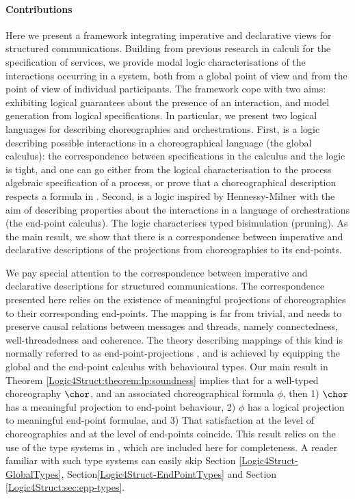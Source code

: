 \paragraph{Contributions}
Here we present a framework integrating imperative and declarative
views for structured communications. Building from previous research
in calculi for the specification of services, we
provide modal logic characterisations of the interactions occurring in
a system, both from a global point of view and from the point of view
of individual participants. The framework cope with two aims: exhibiting logical
guarantees about the presence of an interaction, and model generation
from logical specifications. In particular, we present two logical
languages for describing choreographies and orchestrations. First, \GL
is a logic describing possible interactions in a choreographical
language (the global calculus): the correspondence between
specifications in the calculus and the logic is tight, and one can go
either from the logical characterisation to the process algebraic
specification of a process, or prove that a choreographical
description respects a formula in \GL\!\!. Second, \LL is a logic
inspired by Hennessy-Milner with the aim of describing properties
about the interactions in a language of orchestrations (the end-point
calculus). The logic characterises typed bisimulation (pruning). As
the main result, we show that there is a correspondence between
imperative and declarative descriptions of the projections from
choreographies to its end-points. 


We pay special attention to the correspondence between imperative and
declarative descriptions for structured communications. The
correspondence presented here relies on the existence of meaningful
projections of choreographies to their corresponding end-points.  The
mapping is far from trivial, and needs to preserve causal relations
between messages and threads, namely connectedness, well-threadedness
and coherence. The theory describing mappings of this kind is normally
referred to as end-point-projections \cite{carbone7scc}, and is
achieved by equipping the global and the end-point calculus with
behavioural types.  Our main result in Theorem
\ref{Logic4Struct:theorem:lp:soundness} implies that for a well-typed
choreography $\chor$, and an associated choreographical formula
$\phi$, then 1) $\chor$ has a meaningful projection to end-point
behaviour, 2) $\phi$ has a logical projection to meaningful end-point
formulae, and 3) That satisfaction at the level of choreographies and
at the level of end-points coincide. This result relies on the use of
the type systems in \cite{carbone7scc}, which are included here for
completeness. A reader familiar with such type systems can easily skip
Section \ref{Logic4Struct-GlobalTypes},
Section\ref{Logic4Struct-EndPointTypes} and Section
\ref{Logic4Struct:sec:epp-types}.




